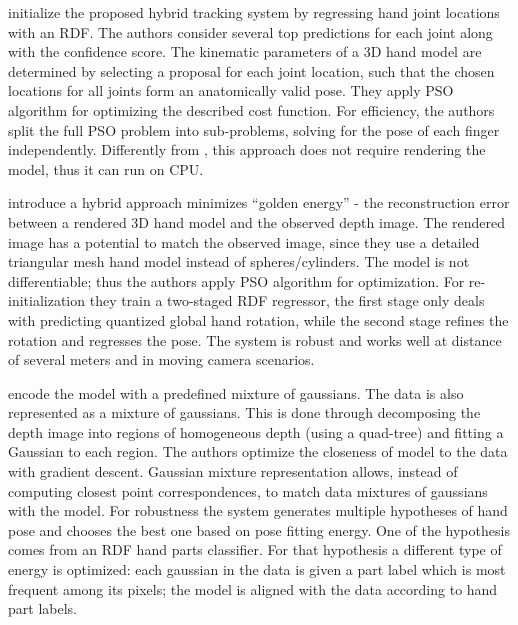 \hspace{-0.4em}
\textbf{\cite{poier2015hybrid}}
initialize the proposed hybrid tracking system by regressing hand joint locations with an RDF. The authors consider several top predictions for each joint along with the confidence score. The kinematic parameters of a 3D hand model are determined by selecting a proposal for each joint location, such that the chosen locations for all joints form an anatomically valid pose. They apply PSO algorithm for optimizing the described cost function. For efficiency, the authors split the full PSO problem into sub-problems, solving for the pose of each finger independently. Differently from \cite{oiko2011hand}, this approach does not require rendering the model, thus it can run on CPU.

\hspace{-0.4em}
\textbf{\cite{sharp2015accurate}} 
introduce a hybrid approach minimizes “golden energy” - the reconstruction error between a rendered 3D hand model and the observed depth image. The rendered image has a potential to match the observed image, since they use a detailed triangular mesh hand model instead of spheres/cylinders. The model is not differentiable; thus the authors apply PSO algorithm for optimization. For re-initialization they train a two-staged RDF regressor, the first stage only deals with predicting quantized global hand rotation, while the second stage refines the rotation and regresses the pose. The system is robust and works well at distance of several meters and in moving camera scenarios.

\hspace{-0.4em}
\textbf{\cite{sridhar2015fast}} 
encode the model with a predefined mixture of gaussians. The data is also represented as a mixture of gaussians. This is done through decomposing the depth image into regions of homogeneous depth (using a quad-tree) and fitting a Gaussian to each region. The authors optimize the closeness of model to the data with gradient descent. Gaussian mixture representation allows, instead of computing closest point correspondences, to match data mixtures of gaussians with the model. For robustness the system generates multiple hypotheses of hand pose and chooses the best one based on pose fitting energy. One of the hypothesis comes from an RDF hand parts classifier. For that hypothesis a different type of energy is optimized: each gaussian in the data is given a part label which is most frequent among its pixels; the model is aligned with the data according to hand part labels.

